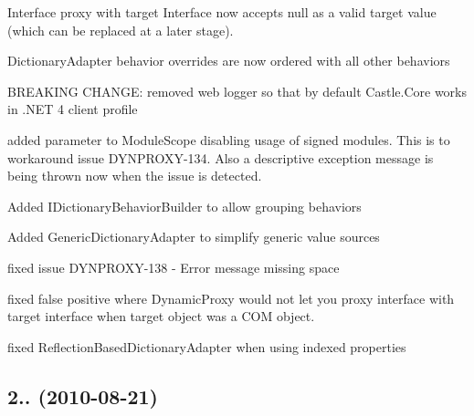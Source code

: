 \begin{DoxyItemize}
\item Interface proxy with target Interface now accepts null as a valid target value (which can be replaced at a later stage).
\item Dictionary\+Adapter behavior overrides are now ordered with all other behaviors
\item B\+R\+E\+A\+K\+I\+NG C\+H\+A\+N\+GE\+: removed web logger so that by default Castle.\+Core works in .N\+ET 4 client profile
\item added parameter to Module\+Scope disabling usage of signed modules. This is to workaround issue D\+Y\+N\+P\+R\+O\+X\+Y-\/134. Also a descriptive exception message is being thrown now when the issue is detected.
\item Added I\+Dictionary\+Behavior\+Builder to allow grouping behaviors
\item Added Generic\+Dictionary\+Adapter to simplify generic value sources
\item fixed issue D\+Y\+N\+P\+R\+O\+X\+Y-\/138 -\/ Error message missing space
\item fixed false positive where Dynamic\+Proxy would not let you proxy interface with target interface when target object was a C\+OM object.
\item fixed Reflection\+Based\+Dictionary\+Adapter when using indexed properties
\end{DoxyItemize}

\subsection*{2.. (2010-\/08-\/21)}


